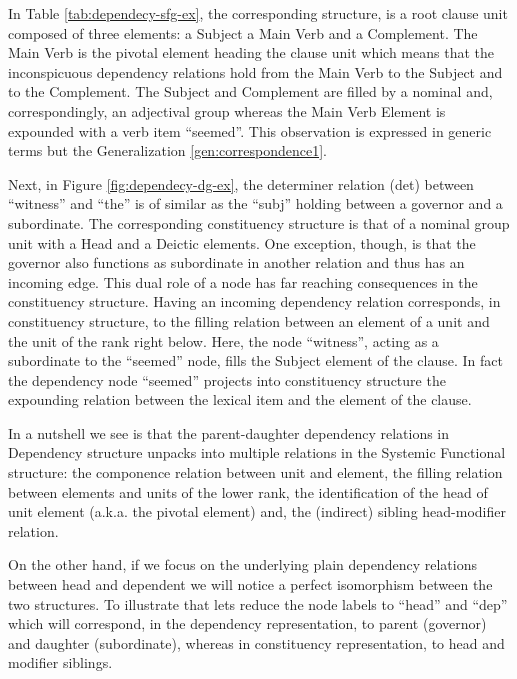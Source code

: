 In Table \ref{tab:dependecy-sfg-ex}, the corresponding structure, is a root clause unit composed of three elements: a Subject a Main Verb and a Complement. The Main Verb is the pivotal element heading the clause unit which means that the inconspicuous dependency relations hold from the Main Verb to the Subject and to the Complement. The Subject and Complement are filled by a nominal and, correspondingly, an adjectival group whereas the Main Verb Element is expounded with a verb item ``seemed''.
This observation is expressed in generic terms but the Generalization \ref{gen:correspondence1}. 

Next, in Figure \ref{fig:dependecy-dg-ex}, the determiner relation (det) between ``witness'' and ``the'' is of similar as the ``subj'' holding between a governor and a subordinate. The corresponding constituency structure is that of a nominal group unit with a Head and a Deictic elements. One exception, though, is that the governor also functions as subordinate in another relation and thus has an incoming edge. This dual role of a node has far reaching consequences in the constituency structure. Having an incoming dependency relation corresponds, in constituency structure, to the filling relation between an element of a unit and the unit of the rank right below. Here, the node ``witness'', acting as a subordinate to the ``seemed'' node, fills the Subject element of the clause. In fact the dependency node ``seemed'' projects into constituency structure the expounding relation between the lexical item and the element of the clause.

In a nutshell we see is that the parent-daughter dependency relations in Dependency structure unpacks into multiple relations in the Systemic Functional structure: the componence relation between unit and element, the filling relation between elements and units of the lower rank, the identification of the head of unit element (a.k.a. the pivotal element) and, the (indirect) sibling head-modifier relation.

On the other hand, if we focus on the underlying plain dependency relations between head and dependent we will notice a perfect isomorphism between the two structures. To illustrate that lets reduce the node labels to ``head'' and ``dep'' which will correspond, in the dependency representation, to parent (governor) and daughter (subordinate), whereas in constituency representation, to head and modifier siblings. 

